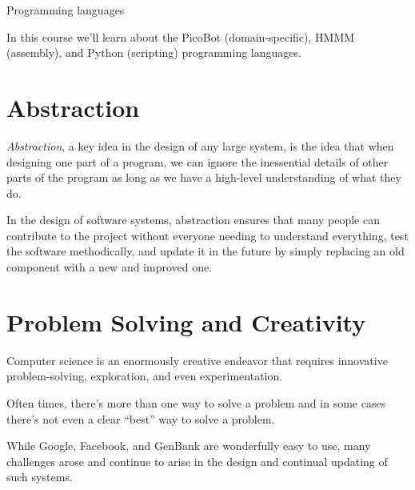 \documentclass[8pt,a4paper,compress,handout]{beamer}
\begin{document}
\begin{frame}[fragile]
\begin{minipage}{100pt}
\begin{center}
\smallskip

\tiny Programming languages
\end{center}
\end{minipage}%

\bigskip

In this course we'll learn about the PicoBot (domain-specific), HMMM (assembly), and Python (scripting) programming languages.
\end{frame}

\section{Abstraction}
\begin{frame}[fragile]
\emph{Abstraction}, a key idea in the design of any large system, is the idea that when designing one part of a program, we can ignore the inessential details of other parts of the program as long as we have a high-level understanding of what they do.

\bigskip

In the design of software systems, abstraction ensures that many people can contribute to the project without everyone needing to understand everything, test the software methodically, and update it in the future by simply replacing an old component with a new and improved one. 
\end{frame}

\section{Problem Solving and Creativity}
\begin{frame}[fragile]
Computer science is an enormously creative endeavor that requires innovative problem-solving, exploration, and even experimentation.

\bigskip

Often times, there's more than one way to solve a problem and in some cases there's not even a clear ``best'' way to solve a problem.

\bigskip

While Google, Facebook, and GenBank are wonderfully easy to use, many challenges arose and continue to arise in the design and continual updating of such systems. 
\end{frame}
\end{document}
